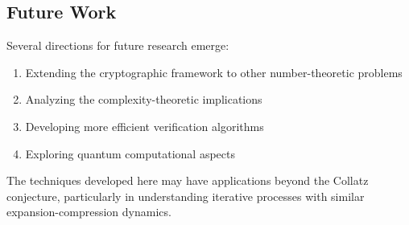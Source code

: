 \subsection{Future Work}

Several directions for future research emerge:
\begin{enumerate}
\item Extending the cryptographic framework to other number-theoretic problems
\item Analyzing the complexity-theoretic implications
\item Developing more efficient verification algorithms
\item Exploring quantum computational aspects
\end{enumerate}

The techniques developed here may have applications beyond the Collatz conjecture, particularly in understanding iterative processes with similar expansion-compression dynamics. 